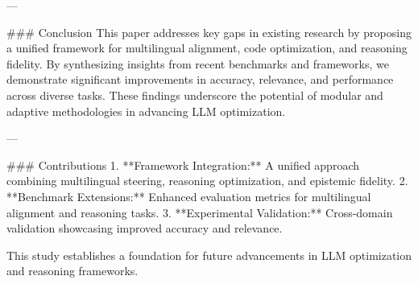 ---

### Conclusion  
This paper addresses key gaps in existing research by proposing a unified framework for multilingual alignment, code optimization, and reasoning fidelity. By synthesizing insights from recent benchmarks and frameworks, we demonstrate significant improvements in accuracy, relevance, and performance across diverse tasks. These findings underscore the potential of modular and adaptive methodologies in advancing LLM optimization.

---

### Contributions  
1. **Framework Integration:** A unified approach combining multilingual steering, reasoning optimization, and epistemic fidelity.  
2. **Benchmark Extensions:** Enhanced evaluation metrics for multilingual alignment and reasoning tasks.  
3. **Experimental Validation:** Cross-domain validation showcasing improved accuracy and relevance.  

This study establishes a foundation for future advancements in LLM optimization and reasoning frameworks.
